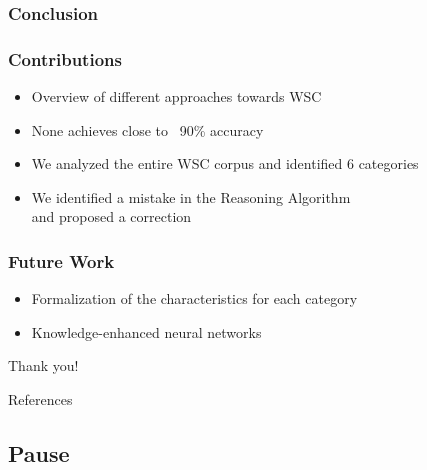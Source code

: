 \documentclass[c,8pt,xcolor...,x11names]{beamer}
\begin{document}
\subsubsection{Conclusion}

\begin{frame}[fragile] \frametitle{Contributions}
  \begin{itemize}
	\normalsize
	\item Overview of different approaches towards WSC
	\item None achieves close to ~90\% accuracy 
	\item We \alert{analyzed} the entire WSC corpus and identified 6 categories
	\item We identified a mistake in the Reasoning Algorithm \\and proposed a correction    
\end{itemize}
\end{frame}

\begin{frame}[fragile]
 \frametitle{Future Work}
 \begin{itemize}
 	\normalsize
 	\item Formalization of the characteristics for each category
 	\item Knowledge-enhanced neural networks
\end{itemize}	
\end{frame}


\begin{frame}
	\vfill
	\begin{LARGE}
		\hfill Thank you! \hfill 
	\end{LARGE}
	\vfill
\end{frame}
\begin{frame}{References}
	
	
	\tiny{
		
	}
\end{frame}

\subsection{Pause}
\end{document}
